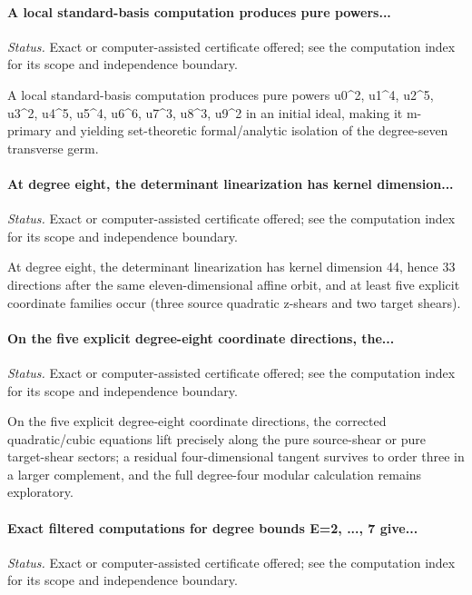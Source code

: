 \label{supp-note-03-003}
\paragraph{A local standard-basis computation produces pure powers...}
\emph{Status.} Exact or computer-assisted certificate offered; see the computation index for its scope and independence boundary.

A local standard-basis computation produces pure powers u0\textasciicircum{}2, u1\textasciicircum{}4, u2\textasciicircum{}5, u3\textasciicircum{}2, u4\textasciicircum{}5, u5\textasciicircum{}4, u6\textasciicircum{}6, u7\textasciicircum{}3, u8\textasciicircum{}3, u9\textasciicircum{}2 in an initial ideal, making it m-primary and yielding set-theoretic formal/analytic isolation of the degree-seven transverse germ.

\label{supp-note-03-004}
\paragraph{At degree eight, the determinant linearization has kernel dimension...}
\emph{Status.} Exact or computer-assisted certificate offered; see the computation index for its scope and independence boundary.

At degree eight, the determinant linearization has kernel dimension 44, hence 33 directions after the same eleven-dimensional affine orbit, and at least five explicit coordinate families occur (three source quadratic z-shears and two target shears).

\label{supp-note-03-005}
\paragraph{On the five explicit degree-eight coordinate directions, the...}
\emph{Status.} Exact or computer-assisted certificate offered; see the computation index for its scope and independence boundary.

On the five explicit degree-eight coordinate directions, the corrected quadratic/cubic equations lift precisely along the pure source-shear or pure target-shear sectors; a residual four-dimensional tangent survives to order three in a larger complement, and the full degree-four modular calculation remains exploratory.

\label{supp-note-03-006}
\paragraph{Exact filtered computations for degree bounds E=2, ..., 7 give...}
\emph{Status.} Exact or computer-assisted certificate offered; see the computation index for its scope and independence boundary.

